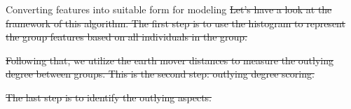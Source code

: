 \documentclass[
 size=14pt,
 paper=smartboard,  %
 mode=present, 		%
 display=slides, 	%
 style=tuliplab,  	%
 pauseslide,
 fleqn,leqno]{powerdot}
\providecommand{\DIFdeltex}[1]{{\protect\color{red}\sout{#1}}}                      %
\providecommand{\DIFdelbegin}{} %
\providecommand{\DIFdelend}{} %
\providecommand{\DIFdel}[1]{\texorpdfstring{\DIFdeltex{#1}}{}} %
\newcommand{\DIFscaledelfig}{0.5}
\newlength{\DIFdelgraphicswidth} %
\newlength{\DIFdelgraphicsheight} %
\newcommand{\DIFdelincludegraphics}[2][]{%
\sbox{\DIFdelgraphicsbox}{\DIFOincludegraphics[#1]{#2}}%
\settoboxwidth{\DIFdelgraphicswidth}{\DIFdelgraphicsbox} %
\settoboxtotalheight{\DIFdelgraphicsheight}{\DIFdelgraphicsbox} %
\scalebox{\DIFscaledelfig}{%
\parbox[b]{\DIFdelgraphicswidth}{\usebox{\DIFdelgraphicsbox}\\[-\baselineskip] \rule{\DIFdelgraphicswidth}{0em}}\llap{\resizebox{\DIFdelgraphicswidth}{\DIFdelgraphicsheight}{%
\setlength{\unitlength}{\DIFdelgraphicswidth}%
\begin{picture}(1,1)%
\thicklines\linethickness{2pt} %
{\color[rgb]{1,0,0}\put(0,0){\framebox(1,1){}}}%
{\color[rgb]{1,0,0}\put(0,0){\line( 1,1){1}}}%
{\color[rgb]{1,0,0}\put(0,1){\line(1,-1){1}}}%
\end{picture}%
}\hspace*{3pt}}} %
} %
\DeclareRobustCommand{\DIFdelbegin}{\DIFOdelbegin \let\includegraphics\DIFdelincludegraphics} %
\DeclareRobustCommand{\DIFdelend}{\DIFOaddend \let\includegraphics\DIFOincludegraphics} %
\begin{document}
\begin{slide}[toc=,bm=]{Converting features into suitable form for modeling}
\DIFdelbegin \DIFdel{Let's have a look at the framework of this algorithm.
The first step is to use the histogram to represent the group features
based on all individuals in the group.
}\DIFdelend %

\DIFdelbegin \DIFdel{Following that,
we utilize the earth mover distances to measure the
outlying degree between groups.
This is the second step:
outlying degree scoring.
}\DIFdelend %

\DIFdelbegin \DIFdel{The last step is to identify the outlying aspects.
}\DIFdelend %

\DIFdelbegin %
\DIFdelend %

\end{slide}
\end{document}
